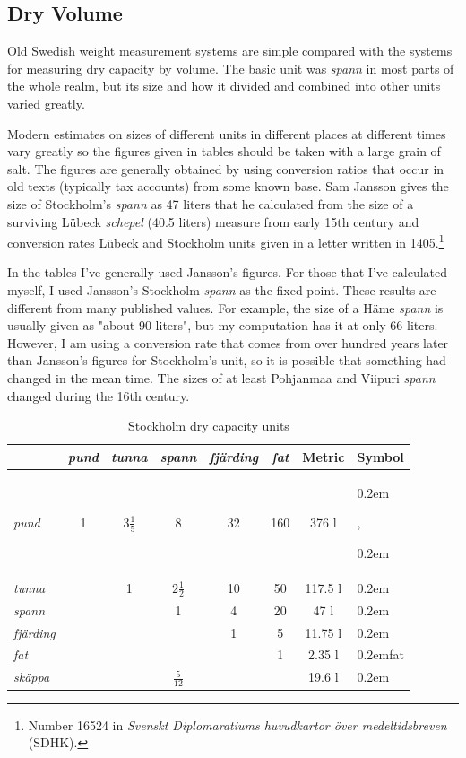 \documentclass[a4paper]{article}
\newcommand{\samplefont}{\fontsize{16}{16}\abcursivefamily\spaceskip0.2em}
\newcommand{\sample}[1]{{\samplefont #1 \strut}}
\begin{document}
\subsection{Dry Volume}


Old Swedish weight measurement systems are simple compared with the
systems for measuring dry capacity by volume. The basic unit was
\emph{spann} in most parts of the whole realm, but its size and how it
divided and combined into other units varied greatly. 

Modern estimates on sizes of different units in different places at
different times vary greatly so the figures given in tables should be
taken with a large grain of salt. The figures are generally obtained
by using conversion ratios that occur in old texts (typically tax
accounts) from some known base. Sam Jansson gives the size of
Stockholm's \emph{spann} as 47 liters that he calculated from the size
of a surviving Lübeck \emph{schepel} (40.5 liters) measure from early
15th century and conversion rates Lübeck and Stockholm units given in a
letter written in 1405.\footnote{Number 16524 in \emph{Svenskt
    Diplomaratiums huvudkartor över medeltidsbreven} (SDHK).}

In the tables I've generally used Jansson's figures. For those that
I've calculated myself, I used Jansson's Stockholm \emph{spann} as the
fixed point. These results are different from many published values.
For example, the size of a Häme \emph{spann} is usually given as
"about 90 liters", but my computation has it at only 66 liters.
However, I am using a conversion rate that comes from over hundred
years later than Jansson's figures for Stockholm's unit, so it is
possible that something had changed in the mean time. The sizes of at
least Pohjanmaa and Viipuri \emph{spann} changed during the 16th
century. 

\begin{table}
\begin{tabular}{lccccc|cl}
  & \emph{pund} & \emph{tunna} & \emph{spann}  & \emph{fjärding} & \emph{fat} & Metric &  Symbol \\
  \hline
  \emph{pund}      & 1 &  $3 \frac{1}{5}$ & 8  & 32 & 160 & 376 l  &  \sample{\abpund}, \sample{\abpundthree}  \\
  \emph{tunna}     &   &  1 & $2 \frac{1}{2}$ & 10 & 50   & 117.5 l &  \sample{\abtunna}   \\
  \emph{spann}     &   &    & 1     & 4  & 20   & 47 l    &  \sample{\abspann}   \\
  \emph{fjärding}  &   &    &       & 1  &  5   & 11.75 l &  \sample{\abfjarding}   \\  
  \emph{fat}       &   &    &       &    &  1   &  2.35 l & \sample{fat} \\
  \emph{skäppa}    &   &    &  $\frac{5}{12}$ &    &      & 19.6 l  &  \sample{\abskappa}   \\
\end{tabular}
  \caption{Stockholm dry capacity units}
  \label{tab:stockholm_volume}
\end{table}
\end{document}
